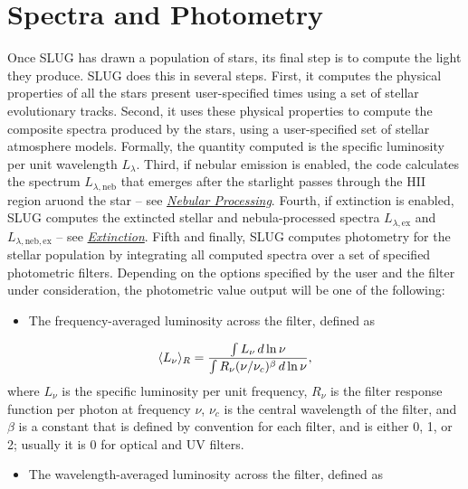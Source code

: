 \documentclass[letterpaper,10pt,english]{sphinxmanual}
\begin{document}
\section{Spectra and Photometry}
\label{intro:ssec-spec-phot}\label{intro:spectra-and-photometry}
Once SLUG has drawn a population of stars, its final step is to compute the light they produce. SLUG does this in several steps. First, it computes the physical properties of all the stars present user-specified times using a set of stellar evolutionary tracks. Second, it uses these physical properties to compute the composite spectra produced by the stars, using a user-specified set of stellar atmosphere models. Formally, the quantity computed is the specific luminosity per unit wavelength \(L_\lambda\). Third, if nebular emission is enabled, the code calculates the spectrum \(L_{\lambda,\mathrm{neb}}\) that emerges after the starlight passes through the HII region aruond the star -- see {\hyperref[intro:ssec-nebula]{\emph{Nebular Processing}}}. Fourth, if extinction is enabled, SLUG computes the extincted stellar and nebula-processed spectra \(L_{\lambda,\mathrm{ex}}\) and \(L_{\lambda,\mathrm{neb,ex}}\) -- see {\hyperref[intro:ssec-extinction]{\emph{Extinction}}}. Fifth and finally, SLUG computes photometry for the stellar population by integrating all computed spectra over a set of specified photometric filters. Depending on the options specified by the user and the filter under consideration, the photometric value output will be one of the following:
\begin{itemize}
\item {} 
The frequency-averaged luminosity across the filter, defined as

\end{itemize}
\begin{gather}
\begin{split}\langle L_\nu\rangle_R = \frac{\int L_\nu \, d\ln\nu}{\int R_\nu (\nu/\nu_c)^\beta \, d\ln\nu},\end{split}\notag
\end{gather}
where \(L_\nu\) is the specific luminosity per unit frequency, \(R_\nu\) is the filter response function per photon at frequency \(\nu\), \(\nu_c\) is the central wavelength of the filter, and \(\beta\) is a constant that is defined by convention for each filter, and is either 0, 1, or 2; usually it is 0 for optical and UV filters.
\begin{itemize}
\item {} 
The wavelength-averaged luminosity across the filter, defined as

\end{itemize}
\end{document}
